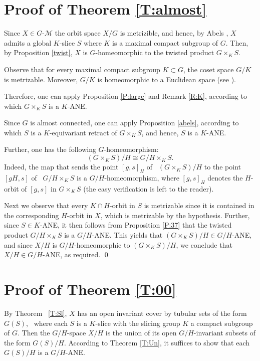 \documentclass{amsart}
\begin{document}
  
   \medskip

\section{Proof of Theorem \ref{T:almost}}\label{almost}

Since $X\in G$-$\mathcal M$ the orbit space $X/G$ is metrizible, and hence, by   Abels \cite[Main Theorem]{abe:74}, $X$ admits a global $K$-slice
$S$ where $K$ is a maximal compact subgroup of $G$. Then, by Proposition \ref{twist}, $X$ is $G$-homeomorphic to the twisted product $G\times_KS$. 

 Observe that for every  maximal compact subgroup $K\subset G$, the coset space $G/K$ is metrizable. Moreover, 
 $G/K$ is homeomorphic to a Euclidean space (see  \cite[Corollary A6]{abe:74}).
 
    Therefore,  
   one can apply  Proposition \ref{P:large} and Remark \ref{R:K},    according to which $G\times_{K} S$ is a $K$-{\rm ANE}. 

Since $G$ is almost connected,    one can apply Proposition \ref{abels}, according to which $S$ is a $K$-equivariant retract of  $G\times_{K} S$, and hence, $S$ is  a $K$-{\rm ANE}.

Further, one has the following $G$-homeomorphism:
$$(G\times_K S)/H\cong G/H\times_ K S.$$
 Indeed, the map that sends the point $[g, s]_H$ of \ $(G\times_K S)/H$  to the point  $[gH, s]$ of \ $G/H\times_K S$ is a $G/H$-homeomorphism, where $[g, s]_H$ denotes the $H$-orbit of  $[g, s]$ in $G\times_KS$ (the easy verification is left to the reader). 

Next we  observe that every $K\cap H$-orbit in $S$ is metrizable since it is  contained in the corresponding $H$-orbit  in $X$, which is metrizable by the hypothesis. Further, since $S\in K$-{\rm ANE},  it then follows from Proposition \ref{P:37}  that the twisted product $G/H\times_ K S$ is a $G/H$-{\rm ANE}. This yields that  $(G\times_ K S)/H\in G/H$-{\rm ANE}, and since $X/H$ is $G/H$-homeomorphic to 
$(G\times_ K S)/H$, we conclude that $X/H\in G/H$-{\rm ANE}, as required.
 \qed

  
  \medskip
  
  \section{ Proof  of Theorem \ref{T:00}}
    
 By Theorem~ \ref{T:Sl},
 $X$ has  an open invariant cover by tubular sets of the form $G(S)$, \  where each $S$ is a $K$-slice  with the slicing group  $K$ a compact   subgroup of $G$.  Then the $G/H$-space $X/H$ is the  union of its open $G/H$-invariant subsets of the form $G(S)/H$. According to  Theorem \ref{T:Un}, it suffices to show that each $G(S)/H$ is a $G/H$-{\rm ANE}.
\end{document}
